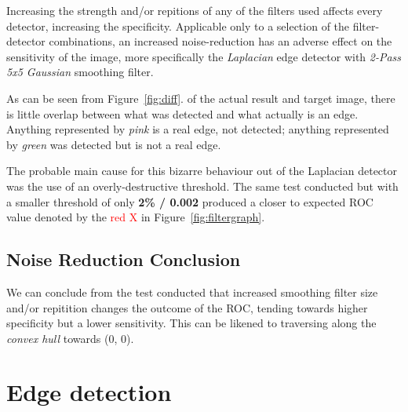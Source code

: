 \documentclass[a4paper]{article}
\newenvironment{floatfig}
  {\par\medskip\noindent\minipage{\linewidth}}
  {\endminipage\par\medskip}
\begin{document}
\begin{multicols*}{2}
\begin{floatfig}
    \vspace{-1em}
    \centering
    \vspace{0.6em}
\end{floatfig}

\noindent Increasing the strength and/or repitions of any of the filters used affects every detector, increasing the specificity. Applicable only to a selection of the filter-detector combinations, an increased noise-reduction has an adverse effect on the sensitivity of the image, more specifically the \emph{Laplacian} edge detector with \emph{2-Pass 5x5 Gaussian} smoothing filter.


\begin{floatfig}
    \centering
\end{floatfig}

As can be seen from Figure~\ref{fig:diff}. of the actual result and target image, there is little overlap between what was detected and what actually is an edge. Anything represented by \emph{pink} is a real edge, not detected; anything represented by \emph{green} was detected but is not a real edge.

The probable main cause for this bizarre behaviour out of the Laplacian detector was the use of an overly-destructive threshold. The same test conducted but with a smaller threshold of only \textbf{2\% / 0.002} produced a closer to expected ROC value denoted by the \textcolor{red}{red X} in Figure~\ref{fig:filtergraph}.

\subsection*{Noise Reduction Conclusion}
We can conclude from the test conducted that increased smoothing filter size and/or repitition changes the outcome of the ROC, tending towards higher specificity but a lower sensitivity. This can be likened to traversing along the \emph{convex hull} towards (0, 0).

\section*{Edge detection}


\end{multicols*}
\end{document}
